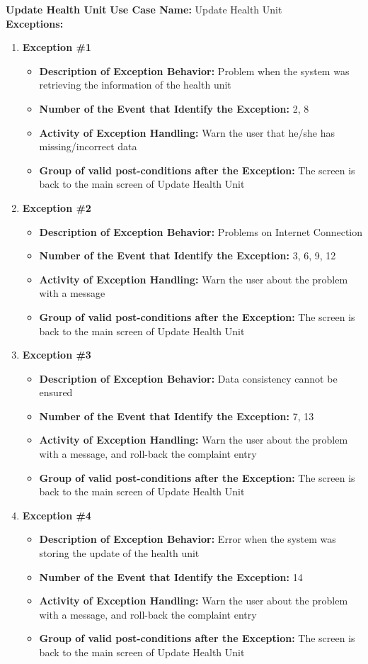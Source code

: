 \documentclass[11pt,twoside]{article}
\begin{document}
\textbf{Update Health Unit}
\textbf{Use Case Name:} Update Health Unit\\
\textbf{Exceptions:}
\begin{enumerate}
\item \textbf{Exception \#1}
 \begin{itemize}
  \item \textbf{Description of Exception Behavior:} Problem when the system was retrieving the information of the health unit
  \item \textbf{Number of the Event that Identify the Exception:} 2, 8
  \item \textbf{Activity of Exception Handling:} Warn the user that he/she has missing/incorrect data
  \item \textbf{Group of valid post-conditions after the Exception:} The screen is back to the main screen of Update Health Unit
 \end{itemize}
 \item \textbf{Exception \#2}
 \begin{itemize}
  \item \textbf{Description of Exception Behavior:} Problems on Internet Connection
  \item \textbf{Number of the Event that Identify the Exception:} 3, 6, 9, 12
  \item \textbf{Activity of Exception Handling:} Warn the user about the problem with a message
  \item \textbf{Group of valid post-conditions after the Exception:} The screen is back to the main screen of Update Health Unit
 \end{itemize}
 \item \textbf{Exception \#3}
 \begin{itemize}
  \item \textbf{Description of Exception Behavior:} Data consistency cannot be ensured
  \item \textbf{Number of the Event that Identify the Exception:} 7, 13
  \item \textbf{Activity of Exception Handling:} Warn the user about the problem with a message, and roll-back the complaint entry
  \item \textbf{Group of valid post-conditions after the Exception:} The screen is back to the main screen of Update Health Unit
 \end{itemize}
 \item \textbf{Exception \#4}
 \begin{itemize}
  \item \textbf{Description of Exception Behavior:} Error when the system was storing the update of the health unit
  \item \textbf{Number of the Event that Identify the Exception:} 14
  \item \textbf{Activity of Exception Handling:} Warn the user about the problem with a message, and roll-back the complaint entry
  \item \textbf{Group of valid post-conditions after the Exception:} The screen is back to the main screen of Update Health Unit
 \end{itemize}
\end{enumerate}
\end{document}
